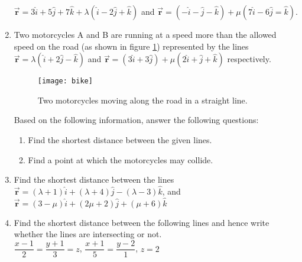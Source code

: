 \begin{enumerate}
	$\overrightarrow{\textbf{r}}=3\hat{i}+5\hat{j}+7\hat{k}+\lambda(\hat{i}-2\hat{j}+\hat{k})$ and $\overrightarrow{\textbf{r}}=(-\hat{i}-\hat{j}-\hat{k})+\mu(7\hat{i}-6\hat{j}=\hat{k})$.
\item Two motorcycles A and B are running at a speed more than the allowed speed on the road (as shown in figure \ref{fig:bike1}) represented by the lines $\overrightarrow{\textbf{r}}=\lambda(\hat{i}+2\hat{j}-\hat{k})$ and $\overrightarrow{\textbf{r}}=(3\hat{i}+3\hat{j})+\mu(2\hat{i}+\hat{j}+\hat{k})$ respectively.\\
	\begin{figure}[H]
		\renewcommand{\thefigure}{\arabic{chapter}.\arabic{section}.\arabic{figure}}
		\centering
		\texttt{[image: bike]}\\
		\caption{Two motorcycles moving along the road in a straight line.}
		\label{fig:bike1}
	\end{figure}
	Based on the following information, answer the following questions:
	\begin{enumerate}
		\item Find the shortest distance between the given lines.
		\item Find a point at which the motorcycles may collide.
	\end{enumerate}
\item Find the shortest distance between the lines\\
		$\overrightarrow{\textbf{r}}=(\lambda+1)\hat{i}+(\lambda+4)\hat{j}-(\lambda-3)\hat{k}$, and\\
			$\overrightarrow{\textbf{r}}=(3-\mu)\hat{i}+(2\mu+2)\hat{j}+(\mu+6)\hat{k}$
\item Find the shortest distance between the following lines and hence write whether the lines are intersecting or not.\\
	$\dfrac{x-1}{2}=\dfrac{y+1}{3}=z$, $\dfrac{x+1}{5}=\dfrac{y-2}{1}$, $z=2$
\end{enumerate}
%
